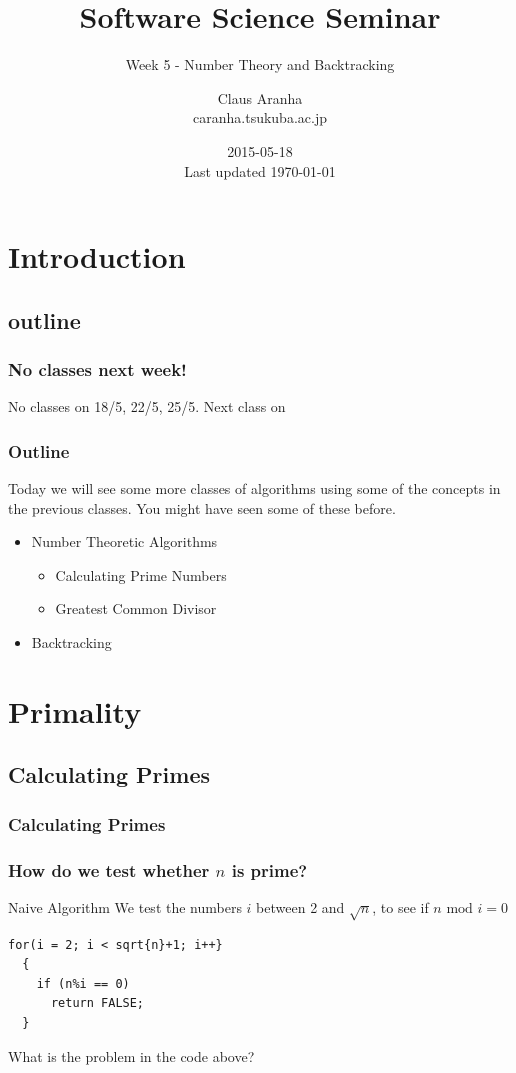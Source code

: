 \documentclass{beamer}
\title[]{Software Science Seminar}
\subtitle[]{Week 5 - Number Theory and Backtracking}
\author[Claus Aranha]{Claus Aranha\\{\footnotesize caranha\@@cs.tsukuba.ac.jp}}
\institute{College of Information Sciences}
\date{2015-05-18\\{\tiny Last updated \today}}
\begin{document}
\section{Introduction}
\subsection{outline}

\begin{frame}
\maketitle
\end{frame}

\begin{frame}
  \frametitle{No classes next week!}

  No classes on \alert{18/5, 22/5, 25/5}.
  \vfill
  Next class on 
\end{frame}

\begin{frame}
\frametitle{Outline}
\begin{block}{}
  Today we will see some more classes of algorithms using some of the
  concepts in the previous classes. You might have seen some of these
  before.
\end{block}
\begin{itemize}
\item Number Theoretic Algorithms
  \begin{itemize}
  \item Calculating Prime Numbers
  \item Greatest Common Divisor
  \end{itemize}
\item Backtracking
\end{itemize}
\end{frame}

\section{Primality}
\subsection{Calculating Primes}
\begin{frame}
  \frametitle{Calculating Primes}
\end{frame}

\begin{frame}
  \frametitle{How do we test whether $n$ is prime?}
  \begin{block}{Naive Algorithm}
    We test the numbers $i$ between 2 and $\sqrt{n}$, to see if 
    $n \text{ mod } i=0$
  \end{block}
  \vfill
\begin{verbatim}
for(i = 2; i < sqrt{n}+1; i++}
  {
    if (n%i == 0)
      return FALSE;
  }
\end{verbatim}
  \vfill
  \begin{block}{}
    What is the problem in the code above?
  \end{block}
\end{frame}
\end{document}
